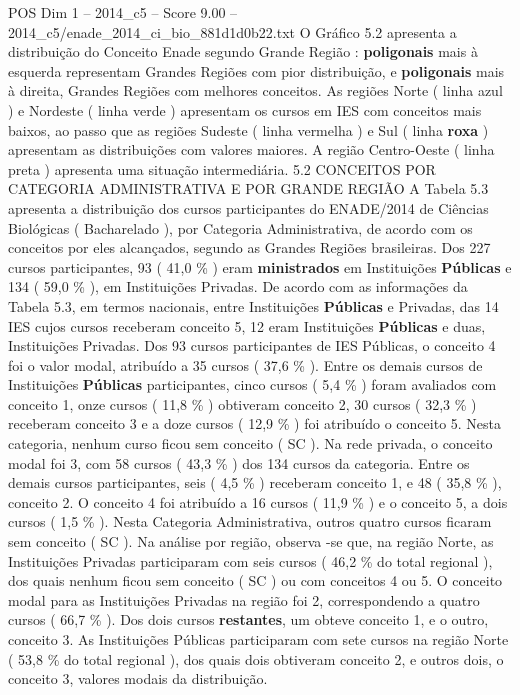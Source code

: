 \begin{textsample}{POS Dim 1 – 2014\_c5 – Score 9.00 – 2014\_c5/enade\_2014\_ci\_bio\_881d1d0b22.txt}
O Gráfico 5.2 apresenta a distribuição do Conceito Enade segundo Grande Região : \textbf{poligonais} mais à esquerda representam Grandes Regiões com pior distribuição, e \textbf{poligonais} mais à direita, Grandes Regiões com melhores conceitos.
As regiões Norte ( linha azul ) e Nordeste ( linha verde ) apresentam os cursos em IES com conceitos mais baixos, ao passo que as regiões Sudeste ( linha vermelha ) e Sul ( linha \textbf{roxa} ) apresentam as distribuições com valores maiores.
A região Centro-Oeste ( linha preta ) apresenta uma situação intermediária. 5.2 CONCEITOS POR CATEGORIA ADMINISTRATIVA E POR GRANDE REGIÃO A Tabela 5.3 apresenta a distribuição dos cursos participantes do ENADE/2014 de Ciências Biológicas ( Bacharelado ), por Categoria Administrativa, de acordo com os conceitos por eles alcançados, segundo as Grandes Regiões brasileiras.
Dos 227 cursos participantes, 93 ( 41,0 \% ) eram \textbf{ministrados} em Instituições \textbf{Públicas} e 134 ( 59,0 \% ), em Instituições Privadas.
De acordo com as informações da Tabela 5.3, em termos nacionais, entre Instituições \textbf{Públicas} e Privadas, das 14 IES cujos cursos receberam conceito 5, 12 eram Instituições \textbf{Públicas} e duas, Instituições Privadas.
Dos 93 cursos participantes de IES Públicas, o conceito 4 foi o valor modal, atribuído a 35 cursos ( 37,6 \% ).
Entre os demais cursos de Instituições \textbf{Públicas} participantes, cinco cursos ( 5,4 \% ) foram avaliados com conceito 1, onze cursos ( 11,8 \% ) obtiveram conceito 2, 30 cursos ( 32,3 \% ) receberam conceito 3 e a doze cursos ( 12,9 \% ) foi atribuído o conceito 5.
Nesta categoria, nenhum curso ficou sem conceito ( SC ).
Na rede privada, o conceito modal foi 3, com 58 cursos ( 43,3 \% ) dos 134 cursos da categoria.
Entre os demais cursos participantes, seis ( 4,5 \% ) receberam conceito 1, e 48 ( 35,8 \% ), conceito 2.
O conceito 4 foi atribuído a 16 cursos ( 11,9 \% ) e o conceito 5, a dois cursos ( 1,5 \% ).
Nesta Categoria Administrativa, outros quatro cursos ficaram sem conceito ( SC ).
Na análise por região, observa -se que, na região Norte, as Instituições Privadas participaram com seis cursos ( 46,2 \% do total regional ), dos quais nenhum ficou sem conceito ( SC ) ou com conceitos 4 ou 5.
O conceito modal para as Instituições Privadas na região foi 2, correspondendo a quatro cursos ( 66,7 \% ).
Dos dois cursos \textbf{restantes}, um obteve conceito 1, e o outro, conceito 3.
As Instituições Públicas participaram com sete cursos na região Norte ( 53,8 \% do total regional ), dos quais dois obtiveram conceito 2, e outros dois, o conceito 3, valores modais da distribuição.

\end{textsample}
